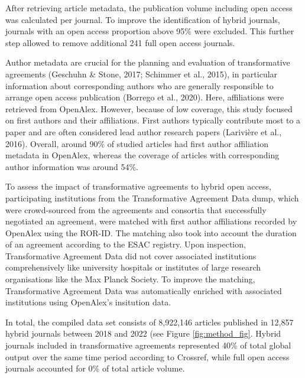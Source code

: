 \documentclass[a4paper,man,floatsintext,longtable,noextraspace,12pt]{apa6}
\begin{document}
After retrieving article metadata, the publication volume including open
access was calculated per journal. To improve the identification of
hybrid journals, journals with an open access proportion above 95\% were
excluded. This further step allowed to remove additional 241 full open
access journals.

Author metadata are crucial for the planning and evaluation of
transformative agreements (Geschuhn \& Stone, 2017; Schimmer et al.,
2015), in particular information about corresponding authors who are
generally responsible to arrange open access publication (Borrego et
al., 2020). Here, affiliations were retrieved from OpenAlex. However,
because of low coverage, this study focused on first authors and their
affiliations. First authors typically contribute most to a paper and are
often considered lead author research papers (Larivière et al., 2016).
Overall, around 90\% of studied articles had first author affiliation
metadata in OpenAlex, whereas the coverage of articles with
corresponding author information was around 54\%.

To assess the impact of transformative agreements to hybrid open access,
participating institutions from the Transformative Agreement Data dump,
which were crowd-sourced from the agreements and consortia that
successfully negotiated an agreement, were matched with first author
affiliations recorded by OpenAlex using the ROR-ID. The matching also
took into account the duration of an agreement according to the ESAC
registry. Upon inspection, Transformative Agreement Data did not cover
associated institutions comprehensively like university hospitals or
institutes of large research organisations like the Max Planck Society.
To improve the matching, Transformative Agreement Data was automatically
enriched with associated institutions using OpenAlex's insitution data.

In total, the compiled data set consists of 8,922,146 articles published
in 12,857 hybrid journals between 2018 and 2022 (see Figure
\ref{fig:method_fig}. Hybrid journals included in transformative
agreements represented 40\% of total global output over the same time
period according to Crossref, while full open access journals accounted
for 0\% of total article volume.
\end{document}

